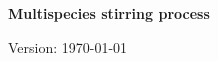 \documentclass[10pt]{article}
\numberwithin{equation}{section}
\numberwithin{equation}{subsection}
\begin{document}
 
 
\begingroup
\begin{center}
 \begingroup\LARGE
\bf Multispecies stirring process
\par\endgroup
 \vspace{3.5em}
 \begingroup\large \bf
 \par\endgroup
\vspace{2em}

\begingroup\sffamily 
%  
\par\endgroup
\vspace{2em}

 Version: \today
\end{center}
%  

\thispagestyle{empty}

\begin{abstract}
\noindent
...
\end{abstract}


\tableofcontents

\end{document}
